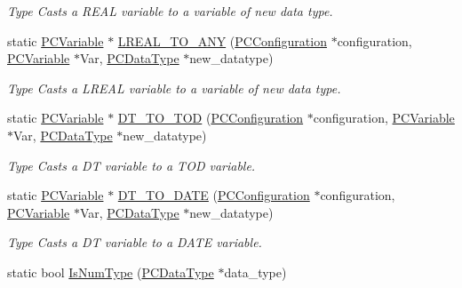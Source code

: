 \begin{DoxyCompactItemize}
\begin{DoxyCompactList}\small\item\em Type Casts a R\+E\+AL variable to a variable of new data type. \end{DoxyCompactList}\item 
static \hyperlink{classpc__emulator_1_1PCVariable}{P\+C\+Variable} $\ast$ \hyperlink{classpc__emulator_1_1Utils_ab4385bfebe2ad37daa6ee7451c8639e2}{L\+R\+E\+A\+L\+\_\+\+T\+O\+\_\+\+A\+NY} (\hyperlink{classpc__emulator_1_1PCConfiguration}{P\+C\+Configuration} $\ast$configuration, \hyperlink{classpc__emulator_1_1PCVariable}{P\+C\+Variable} $\ast$Var, \hyperlink{classpc__emulator_1_1PCDataType}{P\+C\+Data\+Type} $\ast$new\+\_\+datatype)
\begin{DoxyCompactList}\small\item\em Type Casts a L\+R\+E\+AL variable to a variable of new data type. \end{DoxyCompactList}\item 
static \hyperlink{classpc__emulator_1_1PCVariable}{P\+C\+Variable} $\ast$ \hyperlink{classpc__emulator_1_1Utils_a1752451e7c722a09c92e8e8a3ed5c161}{D\+T\+\_\+\+T\+O\+\_\+\+T\+OD} (\hyperlink{classpc__emulator_1_1PCConfiguration}{P\+C\+Configuration} $\ast$configuration, \hyperlink{classpc__emulator_1_1PCVariable}{P\+C\+Variable} $\ast$Var, \hyperlink{classpc__emulator_1_1PCDataType}{P\+C\+Data\+Type} $\ast$new\+\_\+datatype)
\begin{DoxyCompactList}\small\item\em Type Casts a DT variable to a T\+OD variable. \end{DoxyCompactList}\item 
static \hyperlink{classpc__emulator_1_1PCVariable}{P\+C\+Variable} $\ast$ \hyperlink{classpc__emulator_1_1Utils_abe584b6abe60235ae5745b66f06b0976}{D\+T\+\_\+\+T\+O\+\_\+\+D\+A\+TE} (\hyperlink{classpc__emulator_1_1PCConfiguration}{P\+C\+Configuration} $\ast$configuration, \hyperlink{classpc__emulator_1_1PCVariable}{P\+C\+Variable} $\ast$Var, \hyperlink{classpc__emulator_1_1PCDataType}{P\+C\+Data\+Type} $\ast$new\+\_\+datatype)
\begin{DoxyCompactList}\small\item\em Type Casts a DT variable to a D\+A\+TE variable. \end{DoxyCompactList}\item 
static bool \hyperlink{classpc__emulator_1_1Utils_a6895a5161c5267bba4748a173c92037a}{Is\+Num\+Type} (\hyperlink{classpc__emulator_1_1PCDataType}{P\+C\+Data\+Type} $\ast$data\+\_\+type)\hypertarget{classpc__emulator_1_1Utils_a6895a5161c5267bba4748a173c92037a}{}\label{classpc__emulator_1_1Utils_a6895a5161c5267bba4748a173c92037a}


\end{DoxyCompactItemize}
